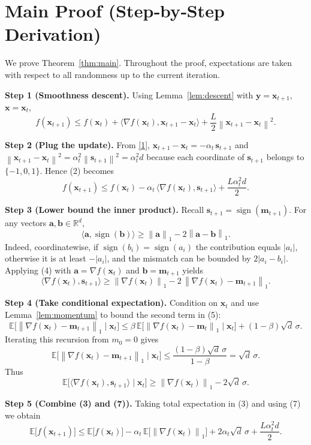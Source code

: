 \documentclass[11pt]{article}
\newcommand{\E}{\mathbb{E}}
\newcommand{\R}{\mathbb{R}}
\newcommand{\sign}{\operatorname{sign}}
\newcommand{\norm}[1]{\left\lVert#1\right\rVert}
\newcommand{\ip}[2]{\langle #1,#2\rangle}
\begin{document}
\section*{Main Proof (Step‑by‑Step Derivation)}
We prove Theorem~\ref{thm:main}. Throughout the proof, expectations are taken with respect to all randomness up to the current iteration.

\noindent\textbf{Step 1 (Smoothness descent).}  
Using Lemma~\ref{lem:descent} with $\bm{y}=\bm{x}_{t+1}$, $\bm{x}=\bm{x}_{t}$,
\[
f(\bm{x}_{t+1})\le f(\bm{x}_{t})+\ip{\nabla f(\bm{x}_{t})}{\bm{x}_{t+1}-\bm{x}_{t}}+\frac{L}{2}\norm{\bm{x}_{t+1}-\bm{x}_{t}}^{2}.
\tag{2}
\]

\noindent\textbf{Step 2 (Plug the update).}  
From \eqref{1}, $\bm{x}_{t+1}-\bm{x}_{t}=-\alpha_{t}\,\bm{s}_{t+1}$ and $\norm{\bm{x}_{t+1}-\bm{x}_{t}}^{2}= \alpha_{t}^{2}\norm{\bm{s}_{t+1}}^{2}= \alpha_{t}^{2}d$ because each coordinate of $\bm{s}_{t+1}$ belongs to $\{-1,0,1\}$. Hence (2) becomes
\[
f(\bm{x}_{t+1})\le f(\bm{x}_{t})-\alpha_{t}\,\ip{\nabla f(\bm{x}_{t})}{\bm{s}_{t+1}}+\frac{L\alpha_{t}^{2}d}{2}.
\tag{3}
\]

\noindent\textbf{Step 3 (Lower bound the inner product).}  
Recall $\bm{s}_{t+1}=\sign(\bm{m}_{t+1})$. For any vectors $\bm{a},\bm{b}\in\R^{d}$,
\[
\ip{\bm{a}}{\sign(\bm{b})} \ge \norm{\bm{a}}_{1} -2\norm{\bm{a}-\bm{b}}_{1}.
\tag{4}
\]
Indeed, coordinatewise, if $\sign(b_{i})= \sign(a_{i})$ the contribution equals $|a_{i}|$, otherwise it is at least $-|a_{i}|$, and the mismatch can be bounded by $2|a_{i}-b_{i}|$. Applying (4) with $\bm{a}=\nabla f(\bm{x}_{t})$ and $\bm{b}=\bm{m}_{t+1}$ yields
\[
\ip{\nabla f(\bm{x}_{t})}{\bm{s}_{t+1}}
\ge \norm{\nabla f(\bm{x}_{t})}_{1}
-2\,\norm{\nabla f(\bm{x}_{t})-\bm{m}_{t+1}}_{1}.
\tag{5}
\]

\noindent\textbf{Step 4 (Take conditional expectation).}  
Condition on $\bm{x}_{t}$ and use Lemma~\ref{lem:momentum} to bound the second term in (5):
\[
\E\big[\norm{\nabla f(\bm{x}_{t})-\bm{m}_{t+1}}_{1}\mid\bm{x}_{t}\big]
\le \beta\,\E\big[\norm{\nabla f(\bm{x}_{t})-\bm{m}_{t}}_{1}\mid\bm{x}_{t}\big]
+(1-\beta)\sqrt{d}\,\sigma .
\]
Iterating this recursion from $m_{0}=0$ gives
\[
\E\big[\norm{\nabla f(\bm{x}_{t})-\bm{m}_{t+1}}_{1}\mid\bm{x}_{t}\big]
\le\frac{(1-\beta)\sqrt{d}\,\sigma}{1-\beta}= \sqrt{d}\,\sigma .
\tag{6}
\]
Thus
\[
\E\big[\ip{\nabla f(\bm{x}_{t})}{\bm{s}_{t+1}}\mid\bm{x}_{t}\big]
\ge \norm{\nabla f(\bm{x}_{t})}_{1}-2\sqrt{d}\,\sigma .
\tag{7}
\]

\noindent\textbf{Step 5 (Combine (3) and (7)).}  
Taking total expectation in (3) and using (7) we obtain
\[
\E\big[f(\bm{x}_{t+1})\big]
\le \E\big[f(\bm{x}_{t})\big]
-\alpha_{t}\,\E\!\big[\norm{\nabla f(\bm{x}_{t})}_{1}\big]
+2\alpha_{t}\sqrt{d}\,\sigma
+\frac{L\alpha_{t}^{2}d}{2}.
\tag{8}
\]
\end{document}
